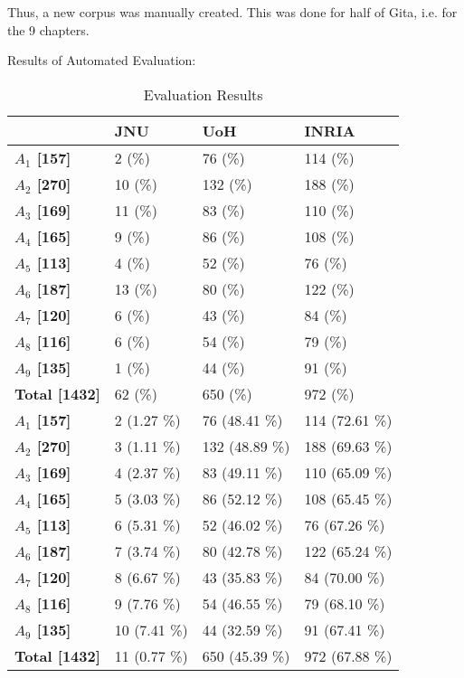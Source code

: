 \documentclass[11pt]{article}
\begin{document}
Thus, a new corpus was manually created. This was done for half of Gita, i.e. for the 9 chapters.


Results of Automated Evaluation:

\begin{table}[h]
\begin{center}
\begin{tabular}{p{1.4cm} | p{1.6cm} | p{1.5cm} | p{1.5cm}}
\hline 
 & \bf JNU & \bf UoH & \bf INRIA \\ 
 \hline
 \bf $A_1$ [157] &   2 (\%) &   76 (\%) &   114 (\%) \\
 \bf $A_2$ [270] &   10 (\%) &   132 (\%) &   188 (\%) \\
 \bf $A_3$ [169] &   11 (\%) &   83 (\%) &   110 (\%) \\
 \bf $A_4$ [165] &   9 (\%) &   86 (\%) &   108 (\%) \\
 \bf $A_5$ [113] &   4 (\%) &   52 (\%) &   76 (\%) \\
 \bf $A_6$ [187] &   13 (\%) &   80 (\%) &   122 (\%) \\
 \bf $A_7$ [120] &   6 (\%) &   43 (\%) &   84 (\%) \\
 \bf $A_8$ [116] &   6 (\%) &   54 (\%) &   79 (\%) \\
 \bf $A_9$ [135] &   1 (\%) &   44 (\%) &   91 (\%) \\
 \bf Total [1432] &   62 (\%) &   650 (\%) &   972 (\%) \\
 
\bf $A_1$ [157] &   2 (1.27 \%) &   76 (48.41 \%) &   114 (72.61 \%) \\
\bf $A_2$ [270] &   3 (1.11 \%) &   132 (48.89 \%) &   188 (69.63 \%) \\
\bf $A_3$ [169] &   4 (2.37 \%) &   83 (49.11 \%) &   110 (65.09 \%) \\
\bf $A_4$ [165] &   5 (3.03 \%) &   86 (52.12 \%) &   108 (65.45 \%) \\
\bf $A_5$ [113] &   6 (5.31 \%) &   52 (46.02 \%) &   76 (67.26 \%) \\
\bf $A_6$ [187] &   7 (3.74 \%) &   80 (42.78 \%) &   122 (65.24 \%) \\
\bf $A_7$ [120] &   8 (6.67 \%) &   43 (35.83 \%) &   84 (70.00 \%) \\
\bf $A_8$ [116] &   9 (7.76 \%) &   54 (46.55 \%) &   79 (68.10 \%) \\
\bf $A_9$ [135] &   10 (7.41 \%) &   44 (32.59 \%) &   91 (67.41 \%) \\
\bf Total [1432] &   11 (0.77 \%) &   650 (45.39 \%) &   972 (67.88 \%) \\
 
\hline
\end{tabular}
\end{center}
\caption{\label{font-table} Evaluation Results }
\end{table}
\end{document}
